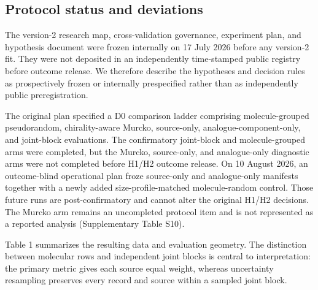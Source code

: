 \documentclass[referee,lineno,pdflatex,Numbered,sn-basic]{sn-jnl}
\begin{document}
\subsection{Protocol status and deviations}

The version-2 research map, cross-validation governance, experiment plan, and hypothesis document were frozen internally on 17 July 2026 before any version-2 fit. They were not deposited in an independently time-stamped public registry before outcome release. We therefore describe the hypotheses and decision rules as prospectively frozen or internally prespecified rather than as independently public preregistration.

The original plan specified a D0 comparison ladder comprising molecule-grouped pseudorandom, chirality-aware Murcko, source-only, analogue-component-only, and joint-block evaluations. The confirmatory joint-block and molecule-grouped arms were completed, but the Murcko, source-only, and analogue-only diagnostic arms were not completed before H1/H2 outcome release. On 10 August 2026, an outcome-blind operational plan froze source-only and analogue-only manifests together with a newly added size-profile-matched molecule-random control. Those future runs are post-confirmatory and cannot alter the original H1/H2 decisions. The Murcko arm remains an uncompleted protocol item and is not represented as a reported analysis (Supplementary Table S10).

Table 1 summarizes the resulting data and evaluation geometry. The distinction between molecular rows and independent joint blocks is central to interpretation: the primary metric gives each source equal weight, whereas uncertainty resampling preserves every record and source within a sampled joint block.
\end{document}
